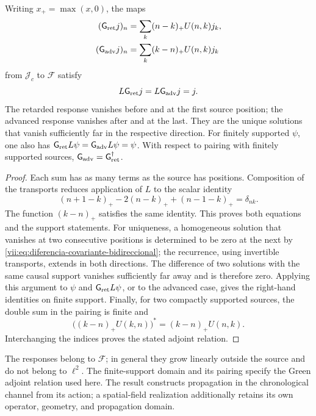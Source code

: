\begin{theorem}
\label{vii:thm:green-cronologico}
Writing \(x_+=\max(x,0)\), the maps
\begin{align}
 (\mathsf{G}_{\rm ret}j)_n&=\sum_k(n-k)_+U(n,k)j_k,\label{vii:eq:green-ret-cronologico}\\
 (\mathsf{G}_{\rm adv}j)_n&=\sum_k(k-n)_+U(n,k)j_k\label{vii:eq:green-adv-cronologico}
\end{align}
from \(\mathcal J_c\) to \(\mathcal F\) satisfy
\[
 L\mathsf{G}_{\rm ret}j=L\mathsf{G}_{\rm adv}j=j.
\]
The retarded response vanishes before and at the first source position;
the advanced response vanishes after and at the last. They are the unique
solutions that vanish sufficiently far in the respective direction.
For finitely supported \(\psi\), one also has
\(\mathsf{G}_{\rm ret}L\psi=\mathsf{G}_{\rm adv}L\psi=\psi\).
With respect to pairing with finitely supported sources,
\(\mathsf{G}_{\rm adv}=\mathsf{G}_{\rm ret}^{\dagger}\).
\end{theorem}
\begin{proof}
Each sum has as many terms as the source has positions.
Composition of the transports reduces application of \(L\) to the scalar
identity
\[
 (n+1-k)_+-2(n-k)_++(n-1-k)_+=\delta_{nk}.
\]
The function \((k-n)_+\) satisfies the same identity. This proves
both equations and the support statements. For uniqueness, a homogeneous
solution that vanishes at two consecutive positions is determined to be zero
at the next by \eqref{vii:eq:diferencia-covariante-bidireccional};
the recurrence, using invertible transports, extends in both
directions. The difference of two solutions with the same causal support
vanishes sufficiently far away and is therefore zero.
Applying this argument to \(\psi\) and \(\mathsf{G}_{\rm ret}L\psi\), or to the
advanced case, gives the right-hand identities on finite support.
Finally, for two compactly supported sources, the double sum in the pairing
is finite and
\[
 \bigl((k-n)_+U(k,n)\bigr)^*=(k-n)_+U(n,k).
\]
Interchanging the indices proves the stated adjoint relation.
\end{proof}

The responses belong to \(\mathcal F\); in general they grow linearly
outside the source and do not belong to \(\ell^2\).
The finite-support domain and its pairing specify the Green adjoint relation
used here. The result constructs propagation in the chronological channel
from its action; a spatial-field realization additionally retains its own
operator, geometry, and propagation domain.

